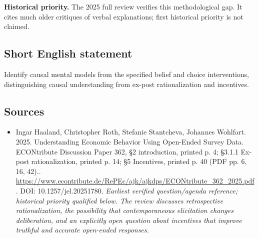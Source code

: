 \documentclass[11pt]{article}
\begin{document}
\par\textbf{Historical priority.} The 2025 full review verifies this methodological gap. It cites much older critiques of verbal explanations; first historical priority is not claimed.

\subsection{Short English statement}
Identify causal mental models from the specified belief and choice interventions, distinguishing causal understanding from ex-post rationalization and incentives.

\subsection{Sources}
\begin{itemize}\raggedright
\item[\textnormal{[S1]}]\hypertarget{source:30007586:1}{} Ingar Haaland, Christopher Roth, Stefanie Stantcheva, Johannes Wohlfart. 2025. Understanding Economic Behavior Using Open-Ended Survey Data. ECONtribute Discussion Paper 362, §2 introduction, printed p. 4; §3.1.1 Ex-post rationalization, printed p. 14; §5 Incentives, printed p. 40 (PDF pp. 6, 16, 42)..
\url{https://www.econtribute.de/RePEc/ajk/ajkdps/ECONtribute_362_2025.pdf}.
DOI: 10.1257/jel.20251780.
{\small\textit{Earliest verified question/agenda reference; historical priority qualified below. The review discusses retrospective rationalization, the possibility that contemporaneous elicitation changes deliberation, and an explicitly open question about incentives that improve truthful and accurate open-ended responses.}}
\end{itemize}
\end{document}
